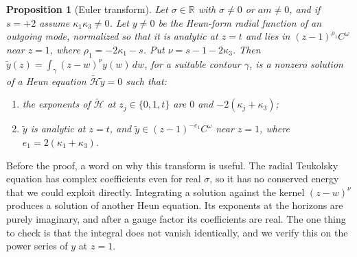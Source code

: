 \documentclass[11pt]{amsart}
\newtheorem{proposition}[theorem]{Proposition}
\theoremstyle{definition}
\theoremstyle{remark}
\numberwithin{equation}{section}
\newcommand{\R}{\mathbb{R}}
\begin{document}
\begin{proposition}[Euler transform]\label{prop:transform}
Let $\sigma\in\R$ with $\sigma\ne0$ or $am\ne0$, and if $s=+2$ assume $\kappa_1\kappa_3\ne0$. Let $y\ne0$ be the Heun-form radial function of an
outgoing mode, normalized so that it is analytic at $z=t$ and lies in $(z-1)^{\rho_1}C^\omega$ near $z=1$, where
$\rho_1=-2\kappa_1-s$. Put $\nu=s-1-2\kappa_3$. Then $\tilde y(z)=\int_\gamma(z-w)^\nu y(w)\,dw$, for a suitable contour
$\gamma$, is a nonzero solution of a Heun equation $\widetilde{\mathcal H}\tilde y=0$ such that:
\begin{enumerate}[label=(\roman*)]
\item the exponents of $\widetilde{\mathcal H}$ at $z_j\in\{0,1,t\}$ are $0$ and $-2(\kappa_j+\kappa_3)$;
\item $\tilde y$ is analytic at $z=t$, and $\tilde y\in(z-1)^{-e_1}C^\omega$ near $z=1$, where $e_1=2(\kappa_1+\kappa_3)$.
\end{enumerate}
\end{proposition}

Before the proof, a word on why this transform is useful. The radial Teukolsky equation has complex coefficients
even for real $\sigma$, so it has no conserved energy that we could exploit directly. Integrating a solution against
the kernel $(z-w)^\nu$ produces a solution of another Heun equation. Its exponents at the horizons are purely
imaginary, and after a gauge factor its coefficients are real. The one thing to check is that the integral does not
vanish identically, and we verify this on the power series of $y$ at $z=1$.
\end{document}
